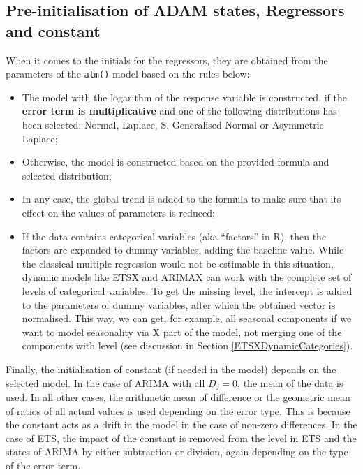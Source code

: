 \documentclass[
]{book}
\providecommand{\tightlist}{%
  \setlength{\itemsep}{0pt}\setlength{\parskip}{0pt}}
\theoremstyle{definition}
\theoremstyle{definition}
\theoremstyle{definition}
\theoremstyle{definition}
\theoremstyle{remark}
\begin{document}
\hypertarget{pre-initialisation-of-adam-states-regressors-and-constant}{%
\subsection{Pre-initialisation of ADAM states, Regressors and constant}\label{pre-initialisation-of-adam-states-regressors-and-constant}}

When it comes to the initials for the regressors, they are obtained from the parameters of the \texttt{alm()} model based on the rules below:

\begin{itemize}
\tightlist
\item
  The model with the logarithm of the response variable is constructed, if the \textbf{error term is multiplicative} and one of the following distributions has been selected: Normal, Laplace, S, Generalised Normal or Asymmetric Laplace;
\item
  Otherwise, the model is constructed based on the provided formula and selected distribution;
\item
  In any case, the global trend is added to the formula to make sure that its effect on the values of parameters is reduced;
\item
  If the data contains categorical variables (aka ``factors'' in R), then the factors are expanded to dummy variables, adding the baseline value. While the classical multiple regression would not be estimable in this situation, dynamic models like ETSX and ARIMAX can work with the complete set of levels of categorical variables. To get the missing level, the intercept is added to the parameters of dummy variables, after which the obtained vector is normalised. This way, we can get, for example, all seasonal components if we want to model seasonality via X part of the model, not merging one of the components with level (see discussion in Section \ref{ETSXDynamicCategories}).
\end{itemize}

Finally, the initialisation of constant (if needed in the model) depends on the selected model. In the case of ARIMA with all \(D_j=0\), the mean of the data is used. In all other cases, the arithmetic mean of difference or the geometric mean of ratios of all actual values is used depending on the error type. This is because the constant acts as a drift in the model in the case of non-zero differences. In the case of ETS, the impact of the constant is removed from the level in ETS and the states of ARIMA by either subtraction or division, again depending on the type of the error term.
\end{document}
